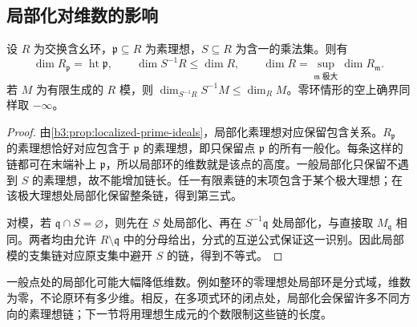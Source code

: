 \subsection{局部化对维数的影响}
\label{b3:subsec:0901:03}

\begin{proposition}\label{b3:prop:dimension-localization}
	设 \(R\) 为交换含幺环，\(\mathfrak p\subseteq R\) 为素理想，\(S\subseteq R\) 为含一的乘法集。则有
	\[
		\dim R_{\mathfrak p}=\operatorname{ht}\mathfrak p,\qquad \dim S^{-1}R\le\dim R,\qquad \dim R=\sup_{\mathfrak m\;\text{极大}}\dim R_{\mathfrak m}.
	\]
	若 \(M\) 为有限生成的 \(R\) 模，则 \(\dim_{S^{-1}R}S^{-1}M\le\dim_R M\)。零环情形的空上确界同样取 \(-\infty\)。
\end{proposition}
\begin{proof}
	由\cref{b3:prop:localized-prime-ideals}，局部化素理想对应保留包含关系。\(R_{\mathfrak p}\) 的素理想恰好对应包含于 \(\mathfrak p\) 的素理想，即只保留点 \(\mathfrak p\) 的所有一般化。每条这样的链都可在末端补上 \(\mathfrak p\)，所以局部环的维数就是该点的高度。一般局部化只保留不遇到 \(S\) 的素理想，故不能增加链长。任一有限素链的末项包含于某个极大理想；在该极大理想处局部化保留整条链，得到第三式。

	对模，若 \(\mathfrak q\cap S=\varnothing\)，则先在 \(S\) 处局部化、再在 \(S^{-1}\mathfrak q\) 处局部化，与直接取 \(M_{\mathfrak q}\) 相同。两者均由允许 \(R\setminus\mathfrak q\) 中的分母给出，分式的互逆公式保证这一识别。因此局部模的支集链对应原支集中避开 \(S\) 的链，得到不等式。
\end{proof}

一般点处的局部化可能大幅降低维数。例如整环的零理想处局部环是分式域，维数为零，不论原环有多少维。相反，在多项式环的闭点处，局部化会保留许多不同方向的素理想链；下一节将用理想生成元的个数限制这些链的长度。
